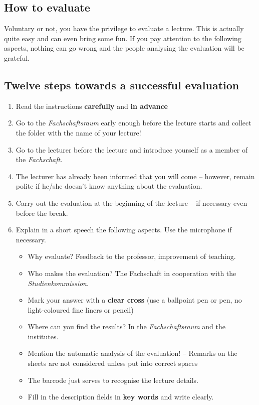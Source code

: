 \documentclass[a4paper,10pt]{article}
\begin{document}
\subsection*{How to evaluate}
Voluntary or not, you have the privilege to evaluate a lecture.  This is actually quite easy and can even bring some fun. If you pay attention to the following aspects, nothing can go wrong and the people analysing the evaluation will be grateful.

\subsection*{Twelve steps towards a successful evaluation}
\begin{enumerate}
\item Read the instructions \textbf{carefully} and \textbf{in advance}
\item Go to the \textit{Fachschaftsraum} early enough before the lecture starts and collect the folder with the name of your lecture!
\item Go to the lecturer before the lecture and introduce yourself as a member of the \textit{Fachschaft}.
\item The lecturer has already been informed that you will come -- however, remain polite if he/she doesn't know anything about the evaluation.
\item Carry out the evaluation at the beginning of the lecture -- if necessary even before the break.
\item Explain in a short speech the following aspects. Use the microphone if necessary.
    \begin{itemize}
    \item Why evaluate? Feedback to the professor, improvement of teaching.
    \item Who makes the evaluation? The Fachschaft in cooperation with the \textit{Studienkommission}.
    \item Mark your answer with a \textbf{clear cross} (use a ballpoint pen or pen, no light-coloured fine liners or pencil)
    \item Where can you find the results? In the \textit{Fachschaftsraum} and the institutes.
    \item Mention the automatic analysis of the evaluation! -- Remarks on the sheets are not considered unless put into correct spaces
    \item The barcode just serves to recognise the lecture details.
    \item Fill in the description fields in \textbf{key words} and write clearly.

\end{itemize}
\end{enumerate}
\end{document}
